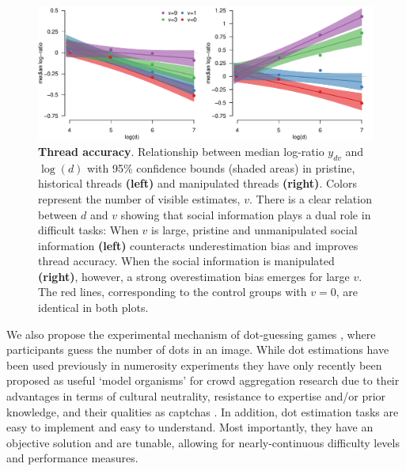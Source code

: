 \documentclass[9pt,a4paper,twocolumn,lineno]{article}
\begin{document}
\begin{figure}[h]
\centering
	\includegraphics[width=1\linewidth]{medians.pdf}
	\caption{\footnotesize \textbf{Thread accuracy}. Relationship between median log-ratio $y_{dv}$ and $\log(d)$ with 95\% confidence bounds (shaded areas) in pristine, historical threads \textbf{(left)} and manipulated threads \textbf{(right)}. Colors represent the number of visible estimates, $v$. There is a clear relation between $d$ and $v$ showing that social information plays a dual role in difficult tasks: When $v$ is large, pristine and unmanipulated social information \textbf{(left)} counteracts underestimation bias and improves thread accuracy. When the social information is manipulated \textbf{(right)}, however, a strong overestimation bias emerges for large $v$. The red lines, corresponding to the control groups with $v=0$, are identical in both plots.}
	\label{fig:medians}
\end{figure}


We also propose the experimental mechanism of dot-guessing games \cite{horton2010dot}, where participants guess the number of dots in an image. While dot estimations have been used previously in numerosity experiments \cite{minturn1951effect, indow1977scaling, krueger1982single} they have only recently been proposed as useful ‘model organisms’ for crowd aggregation research \cite{horton2010dot, ugander2015wisdom} due to their advantages in terms of cultural neutrality, resistance to expertise and/or prior knowledge, and their qualities as captchas \cite{von2008recaptcha}. In addition, dot estimation tasks are easy to implement and easy to understand. Most importantly, they have an objective solution and are tunable, allowing for nearly-continuous difficulty levels and performance measures.
\end{document}
